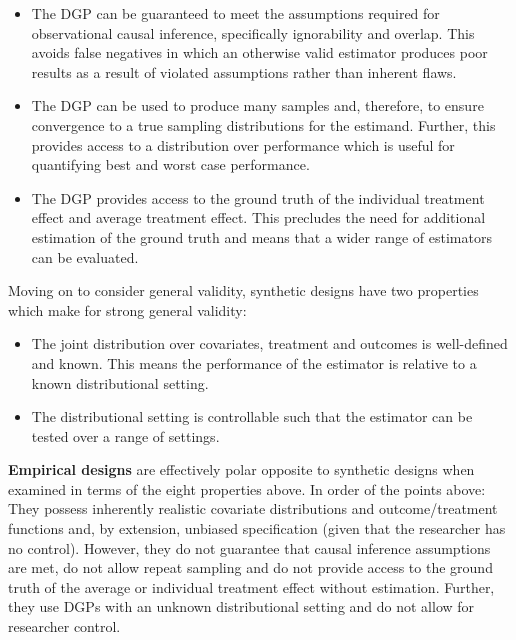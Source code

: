 \documentclass[../main.tex]{subfiles}
\begin{document}
\vspace{\baselineskip}
\begin{itemize}
	\item The DGP can be guaranteed to meet the assumptions required for observational causal inference, specifically ignorability and overlap. This avoids false negatives in which an otherwise valid estimator produces poor results as a result of violated assumptions rather than inherent flaws.\par


\vspace{\baselineskip}
	\item The DGP can be used to produce many samples and, therefore, to ensure convergence to a true sampling distributions for the estimand. Further, this provides access to a distribution over performance which is useful for quantifying best and worst case performance.\par


\vspace{\baselineskip}
	\item The DGP provides access to the ground truth of the individual treatment effect and average treatment effect. This precludes the need for additional estimation of the ground truth and means that a wider range of estimators can be evaluated.
\end{itemize}\par


\vspace{\baselineskip}
Moving on to consider general validity, synthetic designs have two properties which make for strong general validity:\par


\vspace{\baselineskip}
\begin{itemize}
	\item The joint distribution over covariates, treatment and outcomes is well-defined and known. This means the performance of the estimator is relative to a known distributional setting.\par


\vspace{\baselineskip}
	\item The distributional setting is controllable such that the estimator can be tested over a range of settings.
\end{itemize}\par


\vspace{\baselineskip}
\textbf{Empirical designs} are effectively polar opposite to synthetic designs when examined in terms of the eight properties above. In order of the points above: They possess inherently realistic covariate distributions and outcome/treatment functions and, by extension, unbiased specification (given that the researcher has no control). However, they do not guarantee that causal inference assumptions are met, do not allow repeat sampling and do not provide access to the ground truth of the average or individual treatment effect without estimation. Further, they use DGPs with an unknown distributional setting and do not allow for researcher control.\par
\end{document}
